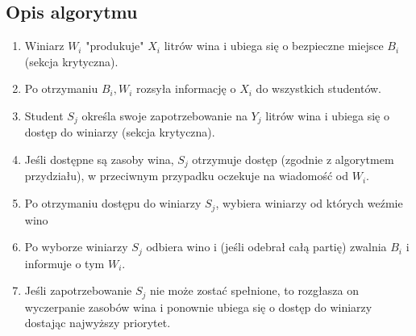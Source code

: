 \documentclass[12pt, a4paper, twoside]{article}
\begin{document}
\subsection*{Opis algorytmu}

\begin{enumerate}
    \item Winiarz $ W_{i} $ "produkuje" $ X_{i} $ litrów wina i ubiega się o bezpieczne miejsce $ B_{i} $ (sekcja krytyczna).
    \item Po otrzymaniu $ B_{i}, W_{i} $ rozsyła informację o $ X_{i} $ do wszystkich studentów.
    \item Student $ S_{j} $ określa swoje zapotrzebowanie na $ Y_{j} $ litrów wina i ubiega się o dostęp do winiarzy (sekcja krytyczna).
    \item Jeśli dostępne są zasoby wina, $ S_{j} $ otrzymuje dostęp (zgodnie z algorytmem przydziału), w przeciwnym przypadku oczekuje na wiadomość od $ W_{i} $.
    \item Po otrzymaniu dostępu do winiarzy $ S_{j} $, wybiera winiarzy od których weźmie wino
    \item Po wyborze winiarzy $ S_{j} $ odbiera wino i (jeśli odebrał całą partię) zwalnia $ B_{i} $ i informuje  o tym $ W_{i} $.
    \item Jeśli zapotrzebowanie $ S_{j} $ nie może zostać spełnione, to rozgłasza on wyczerpanie zasobów wina i ponownie ubiega się o dostęp do winiarzy dostając najwyższy priorytet.
\end{enumerate}
\end{document}

